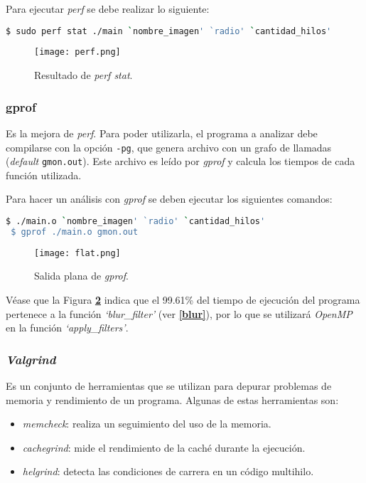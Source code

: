 \documentclass[12pt,a4paper]{article}
\begin{document}
Para ejecutar \emph{perf} se debe realizar lo siguiente:

\begin{lstlisting}[breaklines,language=bash,basicstyle=\ttfamily\color{white}]
  $ sudo perf stat ./main `nombre_imagen' `radio' `cantidad_hilos'
\end{lstlisting}

\begin{figure}[H]
  \centering
  \texttt{[image: perf.png]}
  \caption{Resultado de \emph{perf stat}.}
  \label{outp}
\end{figure}

\subsubsection{gprof}
\label{gprof}
Es la mejora de \emph{perf}. Para poder utilizarla, el programa a analizar
debe compilarse con la opción \verb|-pg|, que genera archivo con un grafo de
llamadas (\emph{default} \verb|gmon.out|). Este archivo es leído por \emph{gprof}
y calcula los tiempos de cada función utilizada.

Para hacer un análisis con \emph{gprof} se deben ejecutar los siguientes comandos:

\begin{lstlisting}[breaklines,language=bash,basicstyle=\ttfamily\color{white}]
 $ ./main.o `nombre_imagen' `radio' `cantidad_hilos'
 $ gprof ./main.o gmon.out
\end{lstlisting}

\begin{figure}[H]
  \centering
  \texttt{[image: flat.png]}
  \caption{Salida plana de \emph{gprof}.}
  \label{goutf}
\end{figure}

Véase que la Figura \textbf{\ref{goutf}} indica que el 99.61\% del tiempo
de ejecución del programa pertenece a la función \emph{`blur\_filter'} (ver
\textbf{\ref{blur}}), por lo que se utilizará \emph{OpenMP} en la función
\emph{`apply\_filters'}.

\subsubsection{\emph{Valgrind}}
\label{valgrind}
Es un conjunto de herramientas que se utilizan para depurar problemas de
memoria y rendimiento de un programa.
Algunas de estas herramientas son:

\begin{itemize}[leftmargin=1.5cm, itemsep=1pt]
  \item \emph{memcheck}: realiza un seguimiento del uso de la memoria.
  \item \emph{cachegrind}: mide el rendimiento de la caché durante la ejecución.
  \item \emph{helgrind}: detecta las condiciones de carrera en un código multihilo.
\end{itemize}
\end{document}
